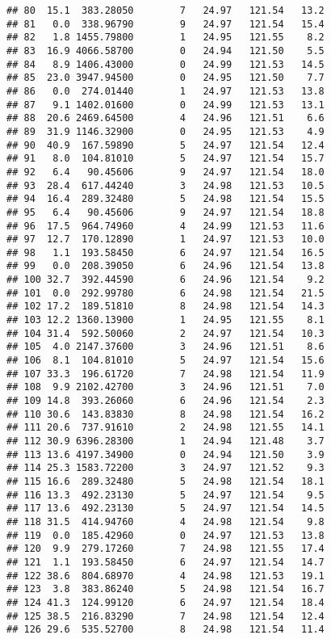 \documentclass[
]{article}
\begin{document}
\begin{verbatim}
## 80  15.1  383.28050        7   24.97   121.54   13.2
## 81   0.0  338.96790        9   24.97   121.54   15.4
## 82   1.8 1455.79800        1   24.95   121.55    8.2
## 83  16.9 4066.58700        0   24.94   121.50    5.5
## 84   8.9 1406.43000        0   24.99   121.53   14.5
## 85  23.0 3947.94500        0   24.95   121.50    7.7
## 86   0.0  274.01440        1   24.97   121.53   13.8
## 87   9.1 1402.01600        0   24.99   121.53   13.1
## 88  20.6 2469.64500        4   24.96   121.51    6.6
## 89  31.9 1146.32900        0   24.95   121.53    4.9
## 90  40.9  167.59890        5   24.97   121.54   12.4
## 91   8.0  104.81010        5   24.97   121.54   15.7
## 92   6.4   90.45606        9   24.97   121.54   18.0
## 93  28.4  617.44240        3   24.98   121.53   10.5
## 94  16.4  289.32480        5   24.98   121.54   15.5
## 95   6.4   90.45606        9   24.97   121.54   18.8
## 96  17.5  964.74960        4   24.99   121.53   11.6
## 97  12.7  170.12890        1   24.97   121.53   10.0
## 98   1.1  193.58450        6   24.97   121.54   16.5
## 99   0.0  208.39050        6   24.96   121.54   13.8
## 100 32.7  392.44590        6   24.96   121.54    9.2
## 101  0.0  292.99780        6   24.98   121.54   21.5
## 102 17.2  189.51810        8   24.98   121.54   14.3
## 103 12.2 1360.13900        1   24.95   121.55    8.1
## 104 31.4  592.50060        2   24.97   121.54   10.3
## 105  4.0 2147.37600        3   24.96   121.51    8.6
## 106  8.1  104.81010        5   24.97   121.54   15.6
## 107 33.3  196.61720        7   24.98   121.54   11.9
## 108  9.9 2102.42700        3   24.96   121.51    7.0
## 109 14.8  393.26060        6   24.96   121.54    2.3
## 110 30.6  143.83830        8   24.98   121.54   16.2
## 111 20.6  737.91610        2   24.98   121.55   14.1
## 112 30.9 6396.28300        1   24.94   121.48    3.7
## 113 13.6 4197.34900        0   24.94   121.50    3.9
## 114 25.3 1583.72200        3   24.97   121.52    9.3
## 115 16.6  289.32480        5   24.98   121.54   18.1
## 116 13.3  492.23130        5   24.97   121.54    9.5
## 117 13.6  492.23130        5   24.97   121.54   14.5
## 118 31.5  414.94760        4   24.98   121.54    9.8
## 119  0.0  185.42960        0   24.97   121.53   13.8
## 120  9.9  279.17260        7   24.98   121.55   17.4
## 121  1.1  193.58450        6   24.97   121.54   14.7
## 122 38.6  804.68970        4   24.98   121.53   19.1
## 123  3.8  383.86240        5   24.98   121.54   16.7
## 124 41.3  124.99120        6   24.97   121.54   18.4
## 125 38.5  216.83290        7   24.98   121.54   12.4
## 126 29.6  535.52700        8   24.98   121.54   11.4

\end{verbatim}
\end{document}
